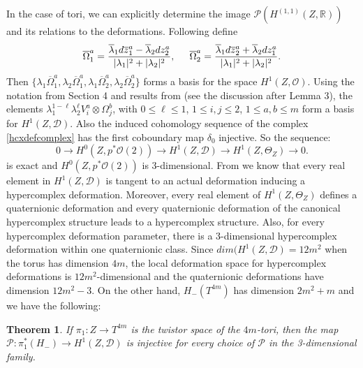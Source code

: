 \documentclass[11pt,oneside,leqno]{amsart}
\theoremstyle{plain}
\newtheorem{theorem}{Theorem}[section]
\theoremstyle{definition}
\begin{document}
In the case of tori, we can explicitly determine the image $\mathcal{P}(H^{(1,1)}(Z,\mathbb{R}))$ and its relations to the deformations.
Following \cite{GPP} define
\begin{equation}\label{omegas}
  {\overline\Omega}_1^a=\frac
  {{\overline\lambda}_1d{\overline z}_1^a-{\overline\lambda}_2dz_2^a}
  {|\lambda_1|^2+|\lambda_2|^2},
  \hspace{.2in}
  {\overline\Omega}_2^a=\frac
  {{\overline\lambda}_1d{\overline z}_2^a+{\overline\lambda}_2dz_1^a}
  {|\lambda_1|^2+|\lambda_2|^2}.
  \end{equation}
  Then $\{\lambda_1{\overline\Omega}_1^a, \lambda_2{\overline\Omega}_1^a,
  \lambda_1{\overline\Omega}_2^a, \lambda_2{\overline\Omega}_2^a\}$ forms a basis for
   the space $H^1(Z, {{\mathcal O}} )$.
Using the notation from Section 4 and results from \cite{GPP} (see the discussion after Lemma 3), the elements
  $\lambda_1^{1-\ell}\lambda_2^\ell V_i^a\otimes\Omega_j^b$, with
  $0\leq \ell\leq 1$, $1\leq i,j\leq 2$, $1\leq a,b\leq m$
  form a basis for $H^1(Z, \mathcal{D})$. Also the induced cohomology sequence of the complex \ref{hcxdefcomplex} has the first coboundary map $\delta_0$ injective. So the sequence:
   \begin{equation}\label{surjection}
  0\to H^0(Z, p^*{{\mathcal O}}(2))\to H^1(Z, \mathcal{D})\to H^1(Z, \Theta_Z)\to 0.
  \end{equation}
  is exact and $H^0(Z, p^*{{\mathcal O}}(2))$ is 3-dimensional. From \cite{GPP} we know that every real element in $H^1(Z, \mathcal{D})$ is tangent to an actual deformation inducing a hypercomplex deformation. Moreover, every real element of $H^1(Z, \Theta_Z)$ defines a quaternionic deformation and every quaternionic deformation of the canonical hypercomplex structure leads to a hypercomplex structure. Also, for every hypercomplex deformation parameter, there is a 3-dimensional hypercomplex deformation within one quaternionic class. Since $dim(H^1(Z,\mathcal{D})=12m^2$ when the torus has dimension $4m$, the local deformation space for hypercomplex deformations is $12m^2$-dimensional and the quaternionic deformations have dimension $12m^2-3$. On the other hand, $H_-(T^{4m})$ has dimension $2m^2+m$ and we have the following:
  \begin{theorem}
  If $\pi_1: Z\to T^{4m}$ is the twistor space of the $4m$-tori, then the map $\mathcal{P}: \pi_1^*(H_-)\to H^1(Z, \mathcal{D})$ is injective for every choice of $\mathcal{P}$ in the 3-dimensional family.
  \end{theorem}
\end{document}
